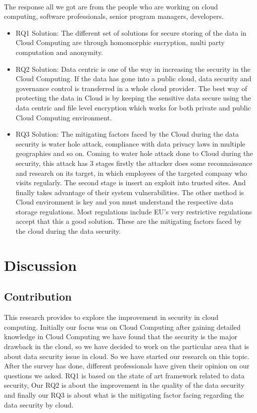 \paragraph{}
The response all we got are from the people who are working on cloud computing, software professionals, senior program managers, developers.
\begin{itemize}
\item{RQ1 Solution:} The different set of solutions for secure storing of the data in Cloud Computing are through homomorphic encryption, multi party computation and anonymity. 
\item{RQ2 Solution:} Data centric is one of the way in increasing the security in the Cloud Computing. If the data has gone into a public cloud, data security and governance control is transferred in a whole cloud provider. The best way of protecting the data in Cloud is by keeping the sensitive data secure using the data centric and file level encryption which works for both private and public Cloud Computing environment.
\item{RQ3 Solution:} The mitigating factors faced by the Cloud during the data security is water hole attack, compliance with data privacy laws in multiple geographies and so on. Coming to water hole attack done to Cloud during the security, this attack has 3 stages firstly the attacker does some reconnaissance and research on its target, in which employees of the targeted company who visits regularly. The second stage is insert an exploit into trusted sites. And finally takes advantage of their system vulnerabilities. The other method is Cloud environment is key and you must understand the respective data storage regulations. Most regulations include EU’s very restrictive regulations accept that this a good solution. These are the mitigating factors faced by the cloud during the data security.
\end{itemize}

\section{Discussion}

\subsection{Contribution}
This research provides to explore the improvement in security in cloud computing. Initially our focus was on Cloud Computing after gaining detailed knowledge in Cloud Computing we have found that the security is the major drawback in the cloud, so we have decided to work on the particular area that is about data security issue in cloud. So we have started our research on this topic. After the survey has done, different professionals have given their opinion on our questions we asked. RQ1 is based on the state of art framework related to data security, Our RQ2 is about the improvement in the quality of the data security and finally our RQ3 is about what is the mitigating factor facing regarding the data security by cloud.  

